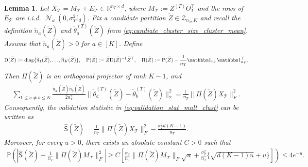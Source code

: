 \documentclass[10pt]{article}
\newtheorem{lemma}{Lemma}
\newcommand{\R}{\mathbb R}
\newcommand{\Id}{\mathbb I}
\newcommand{\wh}{\widehat}
\newcommand{\wt}{\widetilde}
\DeclareMathOperator{\dnorm}{\mathcal N}
\newcommand{\calT}{\mathcal T}
\newcommand{\trg}{T}
\newcommand{\nT}{n_{\trg}}
\newcommand{\sigmaT}{\sigma_{\trg}}
\newcommand{\Ztar}{Z^{(\trg)}}
\newcommand{\ThetaT}{\Theta_{\trg}}
\begin{document}
\begin{lemma}
\label{lem:validation_stat_candidate_partition}
Let $X_\calT=M_\calT+E_\calT\in\R^{\nT\times d}$, where
$M_\calT:=\Ztar\ThetaT^\top$ and the rows of $E_\calT$ are i.i.d.
$\dnorm_d(0,\sigmaT^2\Id_d)$. Fix a candidate partition
$\wt Z\in\mathcal Z_{\nT,K}$ and recall the definition $\wt n_a(\wt Z)$ and $\wt{\theta}^{(\trg)}_a(\wt Z)$ from \eqref{eq:candiate_cluster_size_cluster_mean}. Assume that $\wt n_a(\wt Z)>0$ for $a \in [K]$.
Define
\begin{align}
\label{eq:pi_z_t}
    \mathrm D(\wt Z):=\operatorname{diag}\{\wt n_1(\wt Z),\ldots,\wt n_K(\wt Z)\}, \quad
    \mathrm P(\wt Z):=\wt Z\mathrm D(\wt Z)^{-1}\wt Z^\top, \quad
    \Pi(\wt Z):=\mathrm P(\wt Z)-\frac{1}{\nT}\mathbbm 1_{\nT}\mathbbm 1_{\nT}^\top .
\end{align}
Then $\Pi(\wt Z)$ is an orthogonal projector of rank $K-1$, and
\begin{align}
\label{eq:candidate_partition_projection_identity}
    \sum_{1\le a\neq b\le K}
    \frac{\wt n_a(\wt Z)\wt n_b(\wt Z)}{2\nT^2}
    \|\wt{\theta}^{(\trg)}_a(\wt Z)-\wt{\theta}^{(\trg)}_b(\wt Z)\|_2^2
    =
    \frac{1}{\nT}\|\Pi(\wt Z)X_\calT\|_F^2.
\end{align}
Consequently, the validation statistic in \eqref{eq:validation_stat_mult_clust}
can be written as
\begin{align}
\label{eq:candidate_partition_validation_projection_form}
    \wh{\mathsf S}(\wt Z)
    =
    \frac{1}{\nT}\|\Pi(\wt Z)X_\calT\|_F^2
    -\frac{\sigmaT^2d(K-1)}{\nT}.
\end{align}
Moreover, for every $u>0$, there exists an absolute constant $C>0$ such that
\begin{align}
\label{eq:candidate_partition_validation_concentration}
    \mathbb P\left(
    \left|\wh{\mathsf S}(\wt Z)-\frac{1}{\nT}\|\Pi(\wt Z)M_\calT\|_F^2\right|
    \ge C\left[
    \frac{\sigmaT}{\nT}\|\Pi(\wt Z)M_\calT\|_F\sqrt{u}
    +\frac{\sigmaT^2}{\nT}\{\sqrt{d(K-1)u}+u\}
    \right]\right)\le 4e^{-u}.
\end{align}
\end{lemma}
\end{document}
